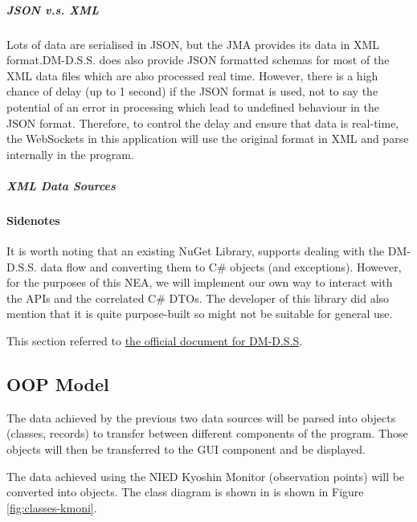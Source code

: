\subparagraph{JSON v.s. XML}

Lots of data are serialised in JSON, but the JMA provides its data in XML format.DM-D.S.S. does also provide JSON formatted schemas for most of the XML data files which are also processed real time. However, there is a high chance of delay (up to 1 second) if the JSON format is used, not to say the potential of an error in processing which lead to undefined behaviour in the JSON format. Therefore, to control the delay and ensure that data is real-time, the WebSockets in this application will use the original format in XML and parse internally in the program.

\subparagraph{XML Data Sources}






\paragraph{Sidenotes}

It is worth noting that an existing NuGet Library,  supports dealing with the DM-D.S.S. data flow and converting them to C\# objects (and exceptions). However, for the purposes of this NEA, we will implement our own way to interact with the APIs and the correlated C\# DTOs. The developer of this library did also mention that it is quite purpose-built so might not be suitable for general use.

This section referred to \href{https://dmdata.jp/docs/reference/}{the official document for DM-D.S.S}.

\subsection{OOP Model}



The data achieved by the previous two data sources will be parsed into objects (classes, records) to transfer between different components of the program. Those objects will then be transferred to the GUI component and be displayed.

The data achieved using the NIED Kyoshin Monitor (observation points) will be converted into objects. The class diagram is shown in is shown in Figure \ref{fig:classes-kmoni}.

